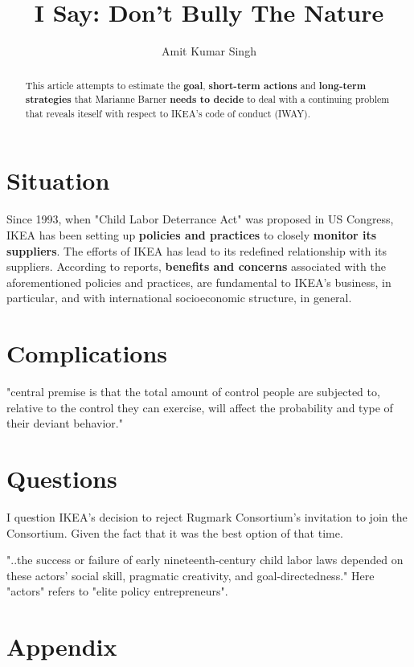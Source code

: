 \documentclass[11pt, a4paper, margin=1in]{IEEEtran}
\begin{document}
\title{I Say: Don't Bully The Nature}
\author{Amit Kumar Singh}
\maketitle

\renewcommand{\abstractname}{Executive Summary}
\begin{abstract}
This article attempts to estimate the \textbf{goal}, \textbf{short-term actions} and \textbf{long-term strategies} that Marianne Barner \textbf{needs to decide} to deal with a continuing problem that reveals iteself with respect to IKEA's code of conduct (IWAY).
\end{abstract}
\section{Situation}
Since 1993, when "Child Labor Deterrance Act" was proposed in US Congress, IKEA has been setting up \textbf{policies and practices} to closely \textbf{monitor its suppliers}. The efforts of IKEA has lead to its redefined relationship with its suppliers. According to reports, \textbf{benefits and concerns} associated with the aforementioned policies and practices, are fundamental to IKEA's business, in particular, and with international socioeconomic structure, in general.
\section{Complications}
"central premise is that the total amount of control people are subjected to, relative to the control they can exercise, will affect the probability and type of their deviant behavior." \cite{tittle2018control}
\section{Questions}
I question IKEA's decision to reject Rugmark Consortium's invitation to join the Consortium. Given the fact that it was the best option of that time. \cite{publichearing1998}

"..the success or failure of early nineteenth-century child labor laws depended on these actors’ social skill, pragmatic creativity, and goal-directedness." \cite{anderson2018policy} Here "actors" refers to "elite policy entrepreneurs".

\section{Appendix}
\end{document}
